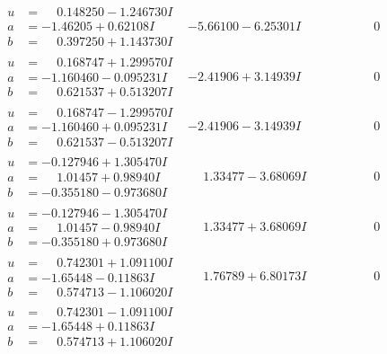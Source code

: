\documentclass[1p]{elsarticle_modified}
\theoremstyle{definition}
\begin{document}
$$\begin{array}{c|c|c}
\begin{aligned}
u &= \phantom{-}0.148250 - 1.246730 I \\
a &= -1.46205 + 0.62108 I \\
b &= \phantom{-}0.397250 + 1.143730 I\end{aligned}
 & -5.66100 - 6.25301 I & \phantom{-0.000000 } 0 \\ \hline\begin{aligned}
u &= \phantom{-}0.168747 + 1.299570 I \\
a &= -1.160460 - 0.095231 I \\
b &= \phantom{-}0.621537 + 0.513207 I\end{aligned}
 & -2.41906 + 3.14939 I & \phantom{-0.000000 } 0 \\ \hline\begin{aligned}
u &= \phantom{-}0.168747 - 1.299570 I \\
a &= -1.160460 + 0.095231 I \\
b &= \phantom{-}0.621537 - 0.513207 I\end{aligned}
 & -2.41906 - 3.14939 I & \phantom{-0.000000 } 0 \\ \hline\begin{aligned}
u &= -0.127946 + 1.305470 I \\
a &= \phantom{-}1.01457 + 0.98940 I \\
b &= -0.355180 - 0.973680 I\end{aligned}
 & \phantom{-}1.33477 - 3.68069 I & \phantom{-0.000000 } 0 \\ \hline\begin{aligned}
u &= -0.127946 - 1.305470 I \\
a &= \phantom{-}1.01457 - 0.98940 I \\
b &= -0.355180 + 0.973680 I\end{aligned}
 & \phantom{-}1.33477 + 3.68069 I & \phantom{-0.000000 } 0 \\ \hline\begin{aligned}
u &= \phantom{-}0.742301 + 1.091100 I \\
a &= -1.65448 - 0.11863 I \\
b &= \phantom{-}0.574713 - 1.106020 I\end{aligned}
 & \phantom{-}1.76789 + 6.80173 I & \phantom{-0.000000 } 0 \\ \hline\begin{aligned}
u &= \phantom{-}0.742301 - 1.091100 I \\
a &= -1.65448 + 0.11863 I \\
b &= \phantom{-}0.574713 + 1.106020 I\end{aligned}

\end{array}$$
\end{document}
